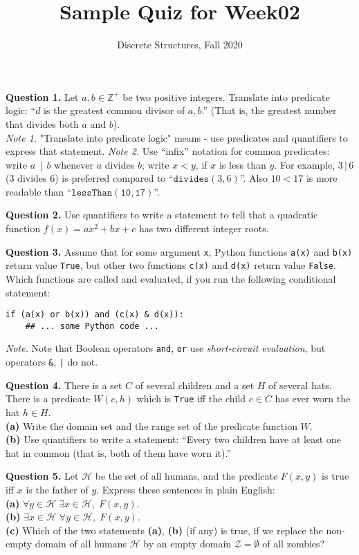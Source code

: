\documentclass[jou]{apa6}
\title{Sample Quiz for Week02}
\author{Discrete Structures, Fall 2020}
\affiliation{RBS}
\begin{document}
\maketitle

{\bf Question 1.} Let $a,b \in \mathbb{Z}^{+}$ be two positive integers.
Translate into predicate logic: ``$d$ is the greatest common divisor 
of $a,b$.'' (That is, 
the greatest number that divides both $a$ and $b$).\\
{\em Note 1.} "Translate into predicate logic" means - use
predicates and quantifiers to express that statement.
{\em Note 2.} Use ``infix'' notation for common predicates: write 
$a\,\mid\,b$ whenever $a$ divides $b$; write $x < y$, if $x$ is less than $y$. For example, $3\,|\,6$ \hspace{1ex} 
($3$ divides $6$) is preferred compared to 
``$\mathtt{divides}(3,6)$''. Also \hspace{1ex} 
$10 < 17$ is more readable than
``$\mathtt{lessThan(10,17)}$''.

\vspace{10pt}
{\bf Question 2.} Use quantifiers to write a 
statement to tell that a quadratic
function $f(x) = ax^2 +bx+c$ 
has two different integer roots.


\vspace{10pt}
{\bf Question 3.} Assume that for some argument {\tt x}, 
Python functions {\tt a(x)} and {\tt b(x)}
return value {\tt True}, but other two functions 
{\tt c(x)} and {\tt d(x)} return value {\tt False}. 
Which functions are called and evaluated, if you run the following conditional statement:
\begin{verbatim}
if (a(x) or b(x)) and (c(x) & d(x)):
    ## ... some Python code ...
\end{verbatim}
{\em Note.} Note that Boolean operators {\tt and}, {\tt or} 
use {\em short-circuit
evaluation}, but operators {\tt \&}, {\tt |} do not. 


\vspace{10pt}
{\bf Question 4.} There is a set $C$ of several children and a 
set $H$ of several hats. There is a predicate $W(c,h)$ which is {\tt True}
iff the child $c \in C$ has ever worn the hat $h \in H$.\\
{\bf (a)} Write the domain set and the range set of the predicate function $W$. \\
{\bf (b)} Use quantifiers to write a statement: ``Every two 
children have at least one hat in common (that is, both of 
them have worn it).''


\vspace{10pt}
{\bf Question 5.}
Let $\mathcal{H}$ be the set of all humans, and the predicate $F(x,y)$ is
true iff $x$ is the father of $y$. Express these sentences in plain English:\\
{\bf (a)} $\forall y \in \mathcal{H}\;\exists x \in \mathcal{H},\;F(x,y)$.\\
{\bf (b)} $\exists x \in \mathcal{H}\;\forall y \in \mathcal{H},\;F(x,y)$.\\
{\bf (c)} Which of the two statements {\bf (a)}, {\bf (b)} (if any) 
is true, if we replace the non-empty domain of all humans $\mathcal{H}$ by an
empty domain $\mathcal{Z} = \emptyset$ of all zombies?
\end{document}
